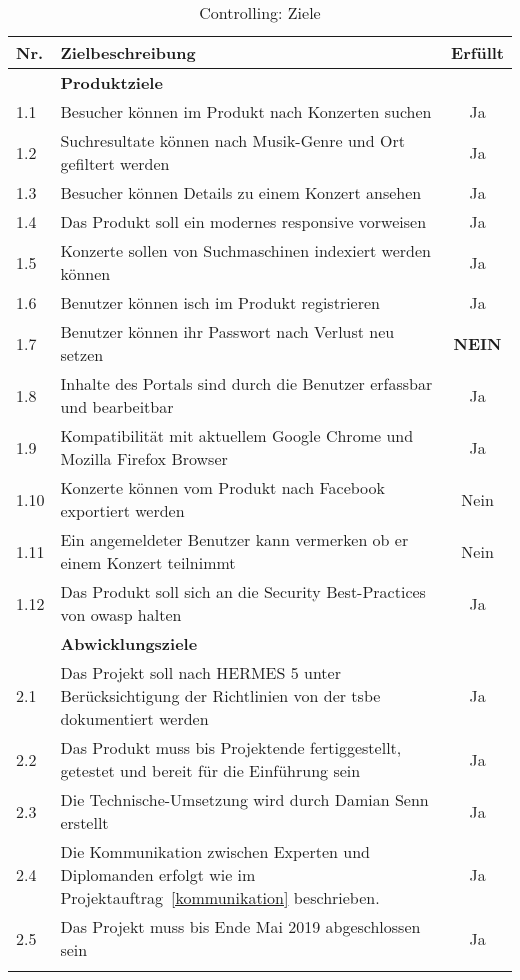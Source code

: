 \begin{longtable}[]{@{}lp{10.5cm}c@{}}
  \toprule
  Nr.  & Zielbeschreibung                                                                                                   & Erfüllt\tabularnewline
  \toprule
  \endhead
       & \textbf{Produktziele}\tabularnewline
  \midrule
  1.1  & Besucher können im Produkt nach Konzerten suchen                                                                   & Ja\tabularnewline
  1.2  & Suchresultate können nach Musik-Genre und Ort gefiltert werden                                                     & Ja\tabularnewline
  1.3  & Besucher können Details zu einem Konzert ansehen                                                                   & Ja\tabularnewline
  1.4  & Das Produkt soll ein modernes \gls{responsive} vorweisen                                                           & Ja\tabularnewline
  1.5  & Konzerte sollen von Suchmaschinen indexiert werden können                                                          & Ja\tabularnewline
  1.6  & Benutzer können isch im Produkt registrieren                                                                       & Ja\tabularnewline
  1.7  & Benutzer können ihr Passwort nach Verlust neu setzen                                                               & \textbf{NEIN}\tabularnewline
  1.8  & Inhalte des Portals sind durch die Benutzer erfassbar und bearbeitbar                                              & Ja\tabularnewline
  1.9  & Kompatibilität mit aktuellem Google Chrome und Mozilla Firefox Browser                                             & Ja\tabularnewline
  1.10 & Konzerte können vom Produkt nach Facebook exportiert werden                                                        & Nein\tabularnewline
  1.11 & Ein angemeldeter Benutzer kann vermerken ob er einem Konzert teilnimmt                                             & Nein\tabularnewline
  1.12 & Das Produkt soll sich an die Security Best-Practices von \Gls{owasp} halten                                        & Ja\tabularnewline
  \toprule
       & \textbf{Abwicklungsziele}\tabularnewline
  \midrule
  2.1  & Das Projekt soll nach HERMES 5 unter Berücksichtigung der Richtlinien von der \Gls{tsbe} dokumentiert werden       & Ja\tabularnewline
  2.2  & Das Produkt muss bis Projektende fertiggestellt, getestet und bereit für die Einführung sein                       & Ja\tabularnewline
  2.3  & Die Technische-Umsetzung wird durch Damian Senn erstellt                                                           & Ja\tabularnewline
  2.4  & Die Kommunikation zwischen Experten und Diplomanden erfolgt wie im Projektauftrag~\ref{kommunikation} beschrieben. & Ja\tabularnewline
  2.5  & Das Projekt muss bis Ende Mai 2019 abgeschlossen sein                                                              & Ja\tabularnewline
  \bottomrule
  \caption{Controlling: Ziele}
\end{longtable}

